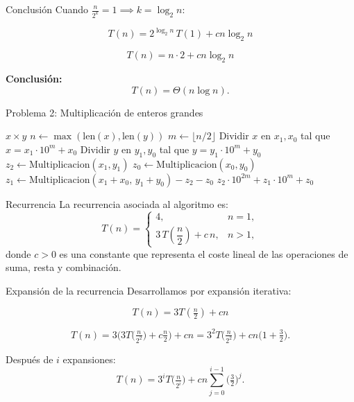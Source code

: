 \documentclass{beamer}
\begin{document}
\begin{frame}{Conclusión}
Cuando \(\tfrac{n}{2^k}=1 \implies k=\log_2 n\):

\[
T(n) = 2^{\log_2 n}\,T(1) + cn\log_2 n
\]

\[
T(n) = n\cdot 2 + cn\log_2 n
\]

\bigskip
\textbf{Conclusión:}
\[
T(n) = \Theta(n\log n).
\]
\end{frame}

\begin{frame}{Problema 2: Multiplicación de enteros grandes}
\begin{algorithm}[H]
\caption{Multiplicación de enteros grandes por divide y vencerás}
\begin{algorithmic}[1]
     \State \Return $x \times y$ 
  \EndIf
  \State $n \gets \max(\text{len}(x), \text{len}(y))$
  \State $m \gets \lfloor n/2 \rfloor$
  \State Dividir $x$ en $x_1, x_0$ tal que $x = x_1 \cdot 10^m + x_0$
  \State Dividir $y$ en $y_1, y_0$ tal que $y = y_1 \cdot 10^m + y_0$
  \State $z_2 \gets \text{Multiplicacion}(x_1, y_1)$
  \State $z_0 \gets \text{Multiplicacion}(x_0, y_0)$
  \State $z_1 \gets \text{Multiplicacion}(x_1+x_0,\, y_1+y_0) - z_2 - z_0$
  \State \Return $z_2 \cdot 10^{2m} + z_1 \cdot 10^m + z_0$
  \EndFunction 
\end{algorithmic}
\end{algorithm}
\end{frame}




\begin{frame}{Recurrencia}
La recurrencia asociada al algoritmo  es:
\[
T(n) =
\begin{cases}
4, & n=1, \\[6pt]
3\,T\!\left(\dfrac{n}{2}\right) + c\,n, & n>1,
\end{cases}
\]
donde $c>0$ es una constante que representa el coste lineal de las operaciones de suma, resta y combinación.
\end{frame}

\begin{frame}{Expansión de la recurrencia}
Desarrollamos por expansión iterativa:

\[
T(n) = 3T\!\left(\tfrac{n}{2}\right)+c n
\]

\[
T(n) = 3\Big(3T\!\big(\tfrac{n}{2^2}\big)+c\tfrac{n}{2}\Big)+c n
= 3^2 T\!\big(\tfrac{n}{2^2}\big) + c n\Big(1+\tfrac{3}{2}\Big).
\]

Después de $i$ expansiones:
\[
T(n)=3^{i}T\!\big(\tfrac{n}{2^{i}}\big) + c n\sum_{j=0}^{i-1}\Big(\tfrac{3}{2}\Big)^{j}.
\]
\end{frame}
\end{document}
